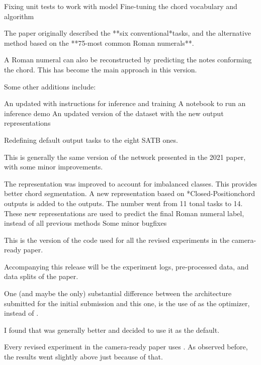 Fixing unit tests to work with  model
Fine-tuning the chord vocabulary and
 algorithm


The paper originally described the **six conventional*tasks,
and the alternative method based on the **75-most common
Roman numerals**.

A Roman numeral can also be reconstructed by predicting the
notes conforming the chord. This has become the main
approach in this version.

Some other additions include:

An updated  with instructions for inference and
training A notebook to run an inference demo An updated
version of the dataset with the new output representations

Redefining default output tasks to the eight SATB ones.

This is generally the same version of the
 network presented in the 2021 paper,
with some minor improvements.

The  representation was improved to
account for imbalanced classes. This provides better chord
segmentation. A new representation based on
*Closed-Positionchord outputs is added to the outputs. The
number went from 11 tonal tasks to 14. These new
representations are used to predict the final Roman numeral
label, instead of all previous methods Some minor bugfixes

This is the version of the code used for all the revised
experiments in the camera-ready paper.

Accompanying this release will be the experiment logs,
pre-processed data, and data splits of the paper.

One (and maybe the only) substantial difference between the
architecture submitted for the initial submission and this
one, is the use of  as the optimizer, instead
of .

I found that  was generally better and decided
to use it as the default.

Every revised experiment in the camera-ready paper uses
. As observed before, the results went
slightly above just because of that.


